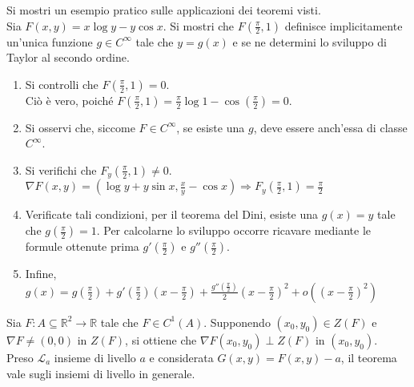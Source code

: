 \begin{example}
    Si mostri un esempio pratico sulle applicazioni dei teoremi visti.\\
    Sia $F(x,y)=x \log y - y \cos x$. Si mostri che $F\left(\tfrac{\pi}{2}, 1\right)$ definisce implicitamente un'unica funzione $g \in C^\infty$ tale che $y=g(x)$ e se ne determini lo sviluppo di Taylor al secondo ordine. 
    \begin{enumerate}
        \item Si controlli che $F\left(\tfrac{\pi}{2}, 1\right)=0$.\\
        Ciò è vero, poiché $F\left(\tfrac{\pi}{2}, 1\right)=\tfrac{\pi}{2} \log 1 - \cos\left(\tfrac{\pi}{2}\right)=0$.
        \item Si osservi che, siccome $F \in C^\infty$, se esiste una $g$, deve essere anch'essa di classe $C^\infty$.
        \item Si verifichi che $F_y(\tfrac{\pi}{2}, 1) \neq 0$.\\
        $\nabla F(x, y) = (\log y + y \sin{x}, \tfrac{x}{y}- \cos{x}) \Rightarrow F_y(\tfrac{\pi}{2},1)=\tfrac{\pi}{2}$
        \item Verificate tali condizioni, per il teorema del Dini, esiste una $g(x)=y$ tale che $g(\tfrac{\pi}{2})=1$. Per calcolarne lo sviluppo occorre ricavare mediante le formule ottenute prima $g'(\tfrac{\pi}{2})$ e $g''(\tfrac{\pi}{2})$.
        \item Infine, $g(x)=g\left(\tfrac{\pi}{2}\right) + g'\left(\tfrac{\pi}{2}\right)\left(x-\tfrac{\pi}{2}\right)+ \tfrac{g''\left(\tfrac{\pi}{2}\right)}{2}\left(x-\tfrac{\pi}{2}\right)^2+ o\left(\left(x-\tfrac{\pi}{2}\right)^2\right)$
    \end{enumerate}
\end{example}
\begin{theorem} \label{Teo: Ortogonalità del gradiente alle curve di livello}
    Sia $F: A \subseteq \mathbb{R}^2 \to \mathbb{R}$ tale che $F \in C^1(A)$. Supponendo $(x_0,y_0) \in Z(F)$ e $\nabla F \neq (0,0)$ in $Z(F)$, si ottiene che $\nabla F(x_0,y_0) \perp Z(F)$ in $(x_0, y_0)$.\\Preso $\mathcal{L}_a$ insieme di livello $a$ e considerata $G(x,y)=F(x,y)-a$, il teorema vale sugli insiemi di livello in generale.
\end{theorem}
